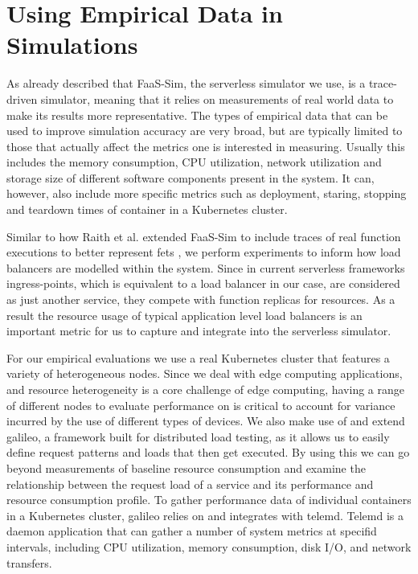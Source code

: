 \section{Using Empirical Data in Simulations}
As already described that FaaS-Sim\cite{faas-sim-github}, the serverless simulator we use, is a trace-driven simulator\cite{thomas-thesis}, meaning that it relies on measurements of real world data to make its results more representative.
The types of empirical data that can be used to improve simulation accuracy are very broad, but are typically limited to those that actually affect the metrics one is interested in measuring.
Usually this includes the memory consumption, CPU utilization, network utilization and storage size of different software components present in the system.
It can, however, also include more specific metrics such as deployment, staring, stopping and teardown times of container in a Kubernetes cluster\cite{skippy}.

Similar to how Raith et al. extended FaaS-Sim to include traces of real function executions to better represent \glspl{fet} \cite{philipp-da}, we perform experiments to inform how load balancers are modelled within the system.
Since in current serverless frameworks ingress-points, which is equivalent to a load balancer in our case, are considered as just another service, they compete with function replicas for resources.
As a result the resource usage of typical application level load balancers is an important metric for us to capture and integrate into the serverless simulator.

For our empirical evaluations we use a real Kubernetes cluster that features a variety of heterogeneous nodes.
Since we deal with edge computing applications, and resource heterogeneity is a core challenge of edge computing\cite{shiEdgeComputingVisionChallenges2016}, having a range of different nodes to evaluate performance on is critical to account for variance incurred by the use of different types of devices.
We also make use of and extend galileo\cite{galileo-github}\cite{operating-energy-aware-galileo}, a framework built for distributed load testing, as it allows us to easily define request patterns and loads that then get executed.
By using this we can go beyond measurements of baseline resource consumption and examine the relationship between the request load of a service and its performance and resource consumption profile.
To gather performance data of individual containers in a Kubernetes cluster, galileo relies on and integrates with telemd\cite{telemd-github}.
Telemd is a daemon application that can gather a number of system metrics at specifid intervals, including CPU utilization, memory consumption, disk I/O, and network transfers.


%
%